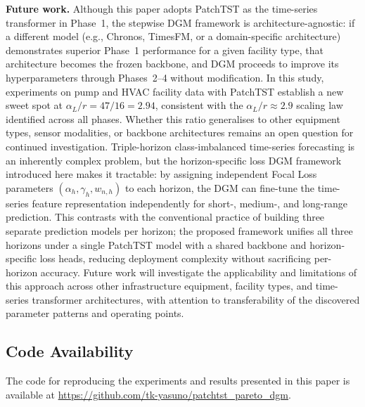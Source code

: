 ﻿\documentclass[twocolumn]{article}
\begin{document}
\textbf{Future work.}
Although this paper adopts PatchTST as the time-series transformer in Phase~1,
the stepwise DGM framework is architecture-agnostic: if a different model
(e.g., Chronos, TimesFM, or a domain-specific architecture) demonstrates
superior Phase~1 performance for a given facility type, that architecture
becomes the frozen backbone, and DGM proceeds to improve its
hyperparameters through Phases~2--4 without modification.
In this study, experiments on pump and HVAC facility data with PatchTST
establish a new sweet spot at $\alpha_L/r = 47/16 = 2.94$, consistent
with the $\alpha_L/r \approx 2.9$ scaling law identified across all phases.
Whether this ratio generalises to other equipment types, sensor modalities,
or backbone architectures remains an open question for continued investigation.
Triple-horizon class-imbalanced time-series forecasting is an inherently
complex problem, but the horizon-specific loss DGM framework introduced here
makes it tractable: by assigning independent Focal Loss parameters
$(\alpha_h, \gamma_h, w_{n,h})$ to each horizon, the DGM can fine-tune
the time-series feature representation independently for short-, medium-,
and long-range prediction.
This contrasts with the conventional practice of building three separate
prediction models per horizon; the proposed framework unifies all three
horizons under a single PatchTST model with a shared backbone and
horizon-specific loss heads, reducing deployment complexity
without sacrificing per-horizon accuracy.
Future work will investigate the applicability and limitations of this
approach across other infrastructure equipment, facility types, and
time-series transformer architectures, with attention to transferability
of the discovered parameter patterns and operating points.


\subsection*{Code Availability}
The code for reproducing the experiments and results presented in this paper is available 
at \url{https://github.com/tk-yasuno/patchtst_pareto_dgm}.



\end{document}
